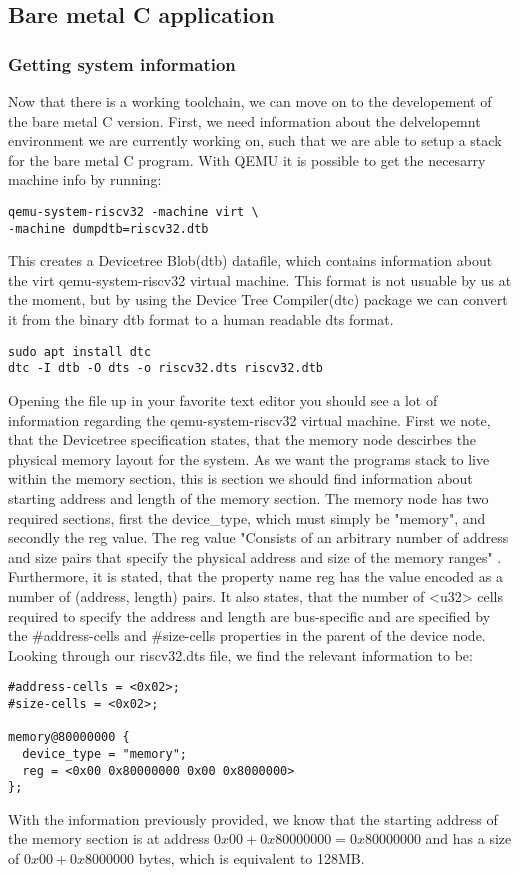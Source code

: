 \subsection{Bare metal C application}
\subsubsection{Getting system information}\label{sec:sys-info}
Now that there is a working toolchain, we can move on to the developement of the
bare metal C version. First, we need information about the delvelopemnt
environment we are currently working on, such that we are able to setup a stack
for the bare metal C program. With QEMU it is possible to get the necesarry
machine info by running:
\begin{lstlisting}
qemu-system-riscv32 -machine virt \
-machine dumpdtb=riscv32.dtb
\end{lstlisting}
This creates a Devicetree Blob(dtb) datafile, which contains information about
the virt qemu-system-riscv32 virtual machine. This format is not usuable by us
at the moment, but by using the Device Tree Compiler(dtc) package we can convert
it from the binary dtb format to a human readable dts format.
\begin{lstlisting}
sudo apt install dtc
dtc -I dtb -O dts -o riscv32.dts riscv32.dtb
\end{lstlisting}
Opening the file up in your favorite text editor you should see a lot of
information regarding the qemu-system-riscv32 virtual machine. First we note,
that the Devicetree specification states, that the memory node descirbes the
physical memory layout for the system. As we want the programs stack
to live within the memory section, this is section we should find information
about starting address and length of the memory section. The memory node has
two required sections, first the device\_type, which must simply be "memory", and
secondly the reg value. The reg value "Consists of an arbitrary number of
address and size pairs that specify the physical address and size of the memory
ranges"\cite{DTS} . Furthermore, it is stated, that the property name reg has
the value encoded as a number of (address, length) pairs. It also states, that
the number of <u32> cells required to specify the address and length are
bus-specific and are specified by the \#address-cells and \#size-cells properties
in the parent of the device node.
Looking through our riscv32.dts file, we find the relevant information to be:
\begin{lstlisting}
#address-cells = <0x02>;
#size-cells = <0x02>;

memory@80000000 {
  device_type = "memory";
  reg = <0x00 0x80000000 0x00 0x8000000>
};
\end{lstlisting}
With the information previously provided, we know that the starting
address of the memory section is at address $0x00 + 0x80000000 = 0x80000000$ and has a size of
$0x00 + 0x8000000$ bytes, which is equivalent to 128MB.

